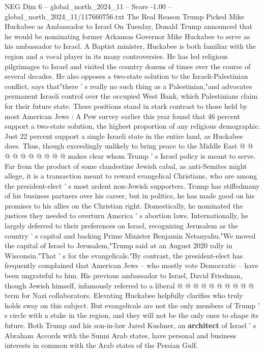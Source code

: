 \begin{textsample}{NEG Dim 6 – global\_north\_2024\_11 – Score -1.00 – global\_north\_2024\_11/117660756.txt}  \label{ex:f6_neg_162}
The Real Reason Trump Picked Mike Huckabee as Ambassador to Israel On Tuesday, Donald Trump announced that he would be nominating former Arkansas Governor Mike Huckabee to serve as his ambassador to Israel.
A Baptist minister, Huckabee is both familiar with the region and a vocal player in its many controversies.
He has led religious pilgrimages to Israel and visited the country dozens of times over the course of several decades.
He also opposes a two-state solution to the Israeli-Palestinian conflict, says that"there ' s really no such thing as a Palestinian,"and advocates permanent Israeli control over the occupied West Bank, which Palestinians claim for their future state.
These positions stand in stark contrast to those held by most American Jews : A Pew survey earlier this year found that 46 percent support a two-state solution, the highest proportion of any religious demographic.
Just 22 percent support a single Israeli state in the entire land, as Huckabee does.
Thus, though exceedingly unlikely to bring peace to the Middle East @ @ @ @ @ @ @ @ @ @ makes clear whom Trump ' s Israel policy is meant to serve.
Far from the product of some clandestine Jewish cabal, as anti-Semites might allege, it is a transaction meant to reward evangelical Christians, who are among the president-elect ' s most ardent non-Jewish supporters.
Trump has stiffedmany of his business partners over his career, but in politics, he has made good on his promises to his allies on the Christian right.
Domestically, he nominated the justices they needed to overturn America ' s abortion laws.
Internationally, he largely deferred to their preferences on Israel, recognizing Jerusalem as the country ' s capital and backing Prime Minister Benjamin Netanyahu."We moved the capital of Israel to Jerusalem,"Trump said at an August 2020 rally in Wisconsin."That ' s for the evangelicals."By contrast, the president-elect has frequently complained that American Jews -- who mostly vote Democratic -- have been ungrateful to him.
His previous ambassador to Israel, David Friedman, though Jewish himself, infamously referred to a liberal @ @ @ @ @ @ @ @ @ @ term for Nazi collaborators.
Elevating Huckabee helpfully clarifies who truly holds sway on this subject.
But evangelicals are not the only members of Trump ' s circle with a stake in the region, and they will not be the only ones to shape its future.
Both Trump and his son-in-law Jared Kushner, an \textbf{architect} of Israel ' s Abraham Accords with the Sunni Arab states, have personal and business interests in common with the Arab states of the Persian Gulf.

\end{textsample}

